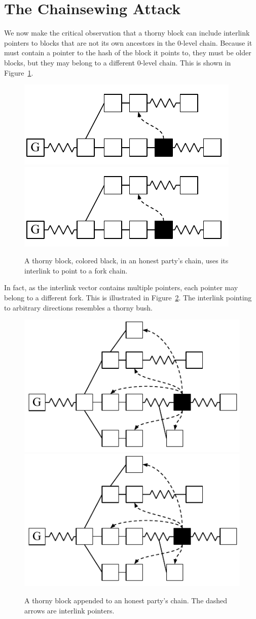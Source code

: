\section{The Chainsewing Attack}\label{sec:attack}
We now make the critical observation that a thorny block can include interlink
pointers to blocks that are not its own ancestors in the $0$-level chain.
Because it must contain a pointer to the hash of the block it points to, they
must be older blocks, but they may belong to a
different $0$-level chain. This is shown in Figure~\ref{fig:false_interlink}.

\begin{figure}
	\begin{center}
		\iftwocolumn
			\includegraphics[width=0.6\columnwidth]{figures/false_interlink.pdf}
		\else
			\includegraphics[width=0.35\columnwidth]{figures/false_interlink.pdf}
		\fi
	\end{center}
    \caption{A thorny block, colored black, in an honest party's chain, uses its interlink to point to a fork chain.}
	\label{fig:false_interlink}
\end{figure}

In fact, as the interlink vector contains multiple pointers, each pointer may
belong to a different fork. This is illustrated in
Figure~\ref{fig:thorny_block}. The interlink pointing to arbitrary directions
resembles a thorny bush.

\begin{figure}
	\begin{center}
		\iftwocolumn
			\includegraphics[width=0.5\columnwidth]{figures/thorny_block.pdf}
		\else
			\includegraphics[width=0.4\columnwidth]{figures/thorny_block.pdf}
		\fi
	\end{center}
	\caption{A thorny block appended to an honest party's chain.
	The dashed arrows are interlink pointers.}
	\label{fig:thorny_block}
\end{figure}

